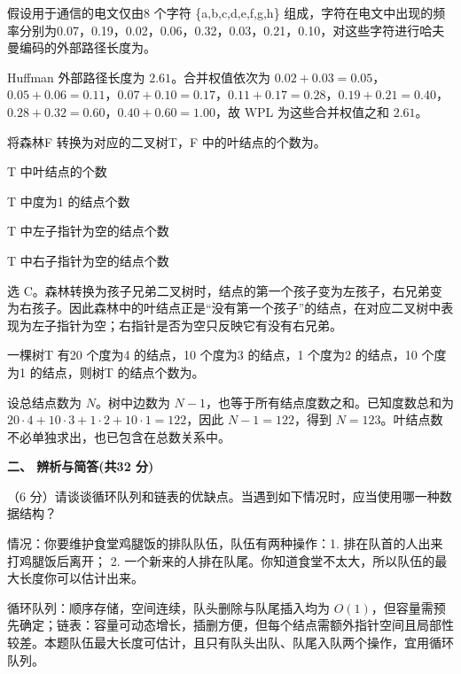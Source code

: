 \begin{question}
假设用于通信的电文仅由8 个字符 \{a,b,c,d,e,f,g,h\} 组成，字符在电文中出现的频率分别为0.07，0.19，0.02，0.06，0.32，0.03，0.21，0.10，对这些字符进行哈夫曼编码的外部路径长度为\blank。
\begin{solution}
Huffman 外部路径长度为 $2.61$。合并权值依次为 $0.02+0.03=0.05$，$0.05+0.06=0.11$，$0.07+0.10=0.17$，$0.11+0.17=0.28$，$0.19+0.21=0.40$，$0.28+0.32=0.60$，$0.40+0.60=1.00$，故 WPL 为这些合并权值之和 $2.61$。
\end{solution}
\end{question}

\begin{question}
将森林F 转换为对应的二叉树T，F 中的叶结点的个数为\blank。
\begin{choiceoptions}[1]
  \item T 中叶结点的个数
  \item T 中度为1 的结点个数
  \item T 中左子指针为空的结点个数
  \item T 中右子指针为空的结点个数
\end{choiceoptions}
\begin{solution}
选 C。森林转换为孩子兄弟二叉树时，结点的第一个孩子变为左孩子，右兄弟变为右孩子。因此森林中的叶结点正是“没有第一个孩子”的结点，在对应二叉树中表现为左子指针为空；右指针是否为空只反映它有没有右兄弟。
\end{solution}
\end{question}

\begin{question}
一棵树T 有20 个度为4 的结点，10 个度为3 的结点，1 个度为2 的结点，10 个度为1 的结点，则树T 的结点个数为\blank。
\begin{solution}
设总结点数为 $N$。树中边数为 $N-1$，也等于所有结点度数之和。已知度数总和为 $20\cdot4+10\cdot3+1\cdot2+10\cdot1=122$，因此 $N-1=122$，得到 $N=123$。叶结点数不必单独求出，也已包含在总数关系中。
\end{solution}
\end{question}

\textbf{二、 辨析与简答(共32 分)}
\begin{question}
（6 分）请谈谈循环队列和链表的优缺点。当遇到如下情况时，应当使用哪一种数据结构？

情况：你要维护食堂鸡腿饭的排队队伍，队伍有两种操作：1. 排在队首的人出来打鸡腿饭后离开； 2. 一个新来的人排在队尾。你知道食堂不太大，所以队伍的最大长度你可以估计出来。
\begin{solution}
循环队列：顺序存储，空间连续，队头删除与队尾插入均为 $O(1)$，但容量需预先确定；链表：容量可动态增长，插删方便，但每个结点需额外指针空间且局部性较差。本题队伍最大长度可估计，且只有队头出队、队尾入队两个操作，宜用循环队列。
\end{solution}
\end{question}

